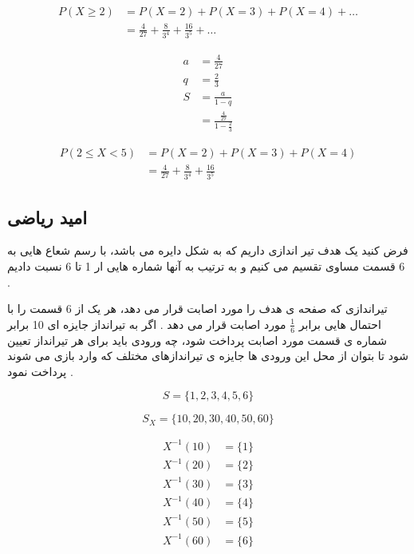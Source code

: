 \documentclass[12pt]{book}
\begin{document}
\begin{align*}
P(X \geq 2) &= P( X = 2 ) + P( X = 3 ) + P( X = 4 ) + \dots \\
&= \frac{4}{27} + \frac{8}{3^{4}} + \frac{16}{3^{5}}  + \dots
\end{align*}

\begin{align*}
a &= \frac{4}{27} \\
q &= \frac{2}{3} \\
S &= \frac{a}{1-q} \\
&= \frac{\frac{4}{27}}{1-\frac{2}{3}}
\end{align*}

\begin{align*}
P( 2 \leq X < 5 ) &= P( X = 2 ) + P( X = 3 ) + P( X = 4 ) \\
&= \frac{4}{27} + \frac{8}{3^{4}} + \frac{16}{3^{5}} 
\end{align*}



\subsection{امید ریاضی}
فرض کنید یک هدف تیر اندازی داریم که به شکل دایره می باشد، با رسم شعاع هایی به 6 قسمت مساوی تقسیم می کنیم و به ترتیب به آنها  شماره هایی ار 1 تا 6 نسبت دادیم .

تیراندازی که صفحه ی هدف را مورد اصابت قرار می دهد، هر یک از 6 قسمت را با احتمال هایی برابر 
$\frac{1}{6}$
مورد اصابت قرار می دهد . اگر به تیرانداز جایزه ای 10 برابر شماره ی قسمت مورد اصابت پرداخت شود، چه ورودی باید برای هر تیرانداز تعیین شود تا بتوان از محل این ورودی ها جایزه ی تیراندازهای مختلف که وارد بازی می شوند پرداخت نمود .






$$
S =  \{ 1, 2, 3, 4, 5, 6 \} 
$$

$$
S_{X} = \{ 10, 20, 30, 40, 50, 60 \} 
$$


\begin{align*}
X^{-1}(10) &= \{ 1 \} \\
X^{-1}(20) &= \{ 2 \} \\
X^{-1}(30) &= \{ 3 \} \\
X^{-1}(40) &= \{ 4 \} \\
X^{-1}(50) &= \{ 5 \} \\
X^{-1}(60) &= \{ 6 \} \\
\end{align*}
\end{document}
